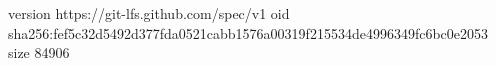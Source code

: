 version https://git-lfs.github.com/spec/v1
oid sha256:fef5c32d5492d377fda0521cabb1576a00319f215534de4996349fc6bc0e2053
size 84906
